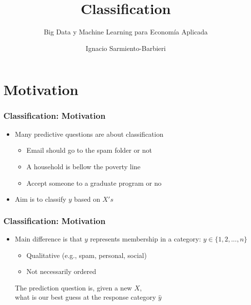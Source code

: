 \documentclass[
  shownotes,
  xcolor={svgnames},
  hyperref={colorlinks,citecolor=DarkBlue,linkcolor=andesred,urlcolor=DarkBlue}
  , aspectratio=169]{beamer}
\begin{document}
\title{Classification}
\subtitle{Big Data y Machine Learning para Economía Aplicada}
\date{}

\author[Sarmiento-Barbieri]{Ignacio Sarmiento-Barbieri}


\begin{frame}[noframenumbering]
\maketitle
\end{frame}


\section{Motivation}
\begin{frame}[fragile]
\frametitle{Classification: Motivation}

\begin{itemize}
  \item Many predictive questions are about classification
  \medskip
  \begin{itemize}
      \item Email should go to the spam folder or not
      \medskip
      \item A household is bellow the poverty line
      \medskip
      \item Accept someone to a graduate program or no
      \medskip
      \end{itemize}
\item Aim is to classify $y$ based on $X's$

\end{itemize}
\end{frame}
\begin{frame}[fragile]
\frametitle{Classification: Motivation}

\begin{itemize}
\item Main difference is that $y$ represents membership in a category: $y\in \{1,2,...,n\}$
\medskip
\begin{itemize}
  \item Qualitative (e.g., spam, personal, social)
  \medskip
  \item Not necessarily ordered
  
\end{itemize}
\bigskip
  \begin{center}
    \begin{it}
    \large
      The prediction question is, given a new $X$, \\
      what is our best guess at the response category $\hat{y}$
    \end{it}
  \end{center}
\end{itemize}


\end{frame}
\end{document}

